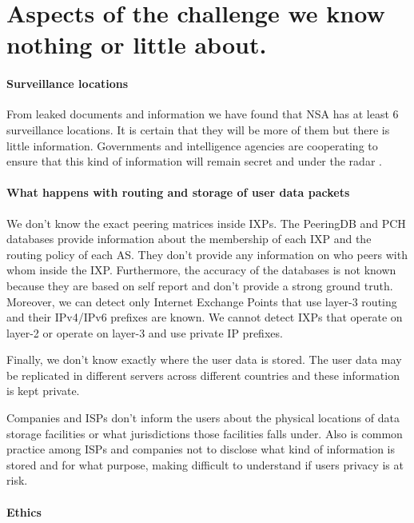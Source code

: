 \section{Aspects of the challenge we know nothing or little about.} 

\paragraph{Surveillance locations}

From leaked documents and information we have found that NSA has at least 6 
surveillance locations. It is certain that they will be more of them but there 
is little information. Governments and intelligence agencies are cooperating to 
ensure that this kind of information will remain secret and under the radar 
\cite{obar2012internet}.

\paragraph{What happens with routing and storage of user data packets}

We don't know the exact peering matrices inside IXPs. The PeeringDB and PCH 
databases provide information about the membership of each IXP and the routing 
policy of each AS. They don't provide any information on who peers with whom 
inside the IXP. Furthermore, the accuracy of the databases is not known because 
they are based on self report and don't provide a strong ground truth. Moreover, 
we can detect only Internet Exchange Points that use layer-3 routing and their 
IPv4/IPv6 prefixes are known. We cannot detect IXPs that operate on layer-2 or 
operate on layer-3 and use private IP prefixes. 

Finally, we don't know exactly where the user data is stored. The user data may 
be replicated in different servers across different countries and these 
information is kept private.

Companies and ISPs don't inform the users about the physical locations of data 
storage facilities or what jurisdictions those facilities falls under. Also is 
common practice among ISPs and companies not to disclose what kind of 
information is stored and for what purpose, making difficult to understand if 
users privacy is at risk.

\paragraph{Ethics}


